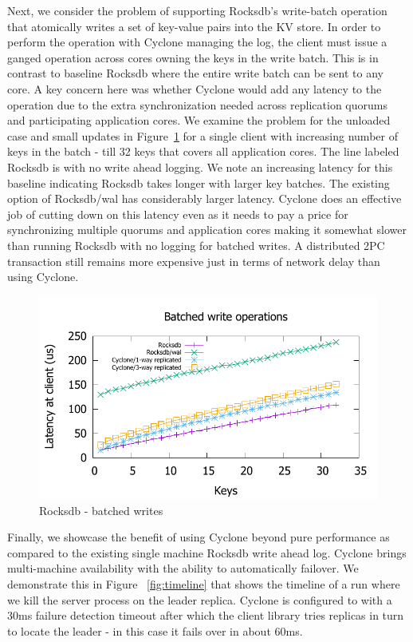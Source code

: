 \documentclass[pageno]{jpaper}
\begin{document}
Next, we consider the problem of supporting Rocksdb's write-batch operation that
atomically writes a set of key-value pairs into the KV store. In order to
perform the operation with Cyclone managing the log, the client must issue a
ganged operation across cores owning the keys in the write batch. This is in
contrast to baseline Rocksdb where the entire write batch can be sent to any
core. A key concern here was whether Cyclone would add any latency to the
operation due to the extra synchronization needed across replication quorums and
participating application cores. We examine the problem for the unloaded case
and small updates in Figure~\ref{fig:rocksdb_multi} for a single client with
increasing number of keys in the batch - till 32 keys that covers all
application cores. The line labeled Rocksdb is with no write ahead logging. We
note an increasing latency for this baseline indicating Rocksdb takes longer
with larger key batches. The existing option of Rocksdb/wal has considerably
larger latency. Cyclone does an effective job of cutting down on this latency
even as it needs to pay a price for synchronizing multiple quorums and
application cores making it somewhat slower than running Rocksdb with no logging
for batched writes. A distributed 2PC transaction still remains more expensive
just in terms of network delay than using Cyclone.

\begin{figure}
\includegraphics[scale=0.6]{results2/rocksdb_multi.pdf}
\caption{Rocksdb - batched writes}
\label{fig:rocksdb_multi}
\end{figure}

Finally, we showcase the benefit of using Cyclone beyond pure performance as
compared to the existing single machine Rocksdb write ahead log. Cyclone brings
multi-machine availability with the ability to automatically failover. We
demonstrate this in Figure ~\ref{fig:timeline} that shows the timeline of a run
where we kill the server process on the leader replica. Cyclone is configured to
with a 30ms failure detection timeout after which the client library tries
replicas in turn to locate the leader - in this case it fails over in about
60ms.
\end{document}

